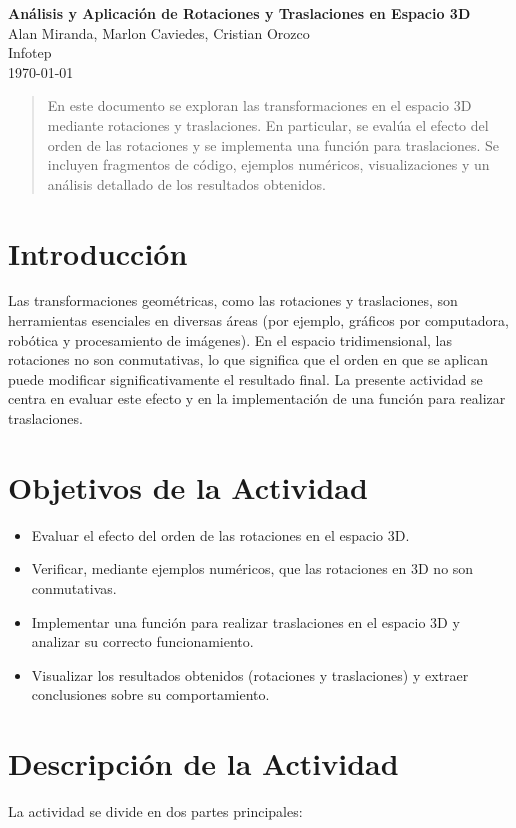 \documentclass[a4paper,10pt]{article}
\begin{document}
\begin{center}
  \Large\textbf{Análisis y Aplicación de Rotaciones y Traslaciones en Espacio 3D}\\[12pt]
  \normalsize
  Alan Miranda, Marlon Caviedes, Cristian Orozco \\
  Infotep \\
  \today
\end{center}

\begin{abstract}
En este documento se exploran las transformaciones en el espacio 3D mediante rotaciones y traslaciones. En particular, se evalúa el efecto del orden de las rotaciones y se implementa una función para traslaciones. Se incluyen fragmentos de código, ejemplos numéricos, visualizaciones y un análisis detallado de los resultados obtenidos.  
\end{abstract}

\section{Introducción}
Las transformaciones geométricas, como las rotaciones y traslaciones, son herramientas esenciales en diversas áreas (por ejemplo, gráficos por computadora, robótica y procesamiento de imágenes). En el espacio tridimensional, las rotaciones no son conmutativas, lo que significa que el orden en que se aplican puede modificar significativamente el resultado final. La presente actividad se centra en evaluar este efecto y en la implementación de una función para realizar traslaciones.

\section{Objetivos de la Actividad}
\begin{itemize}
    \item Evaluar el efecto del orden de las rotaciones en el espacio 3D.
    \item Verificar, mediante ejemplos numéricos, que las rotaciones en 3D no son conmutativas.
    \item Implementar una función para realizar traslaciones en el espacio 3D y analizar su correcto funcionamiento.
    \item Visualizar los resultados obtenidos (rotaciones y traslaciones) y extraer conclusiones sobre su comportamiento.
\end{itemize}

\section{Descripción de la Actividad}
La actividad se divide en dos partes principales:
\end{document}
